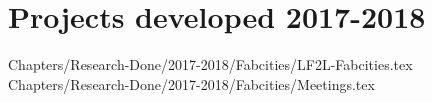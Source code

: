 \part{Projects developed 2017-2018}





{Chapters/Research-Done/2017-2018/Fabcities/LF2L-Fabcities.tex} 
{Chapters/Research-Done/2017-2018/Fabcities/Meetings.tex} 
















